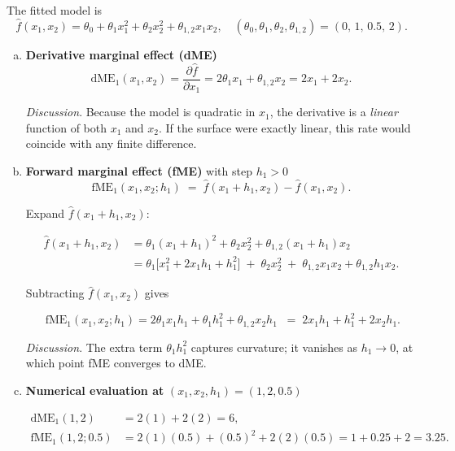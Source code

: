 \loesung
{

\vspace{0.5em}
The fitted model is
\[
  \hat{f}(x_1,x_2)=\theta_0+\theta_1 x_1^{2}+\theta_2 x_2^{2}+ \theta_{1,2}x_1x_2,
  \quad
  (\theta_0,\theta_1,\theta_2,\theta_{1,2})=(0,\,1,\,0.5,\,2).
\]

\begin{enumerate}[a)]
\item \textbf{Derivative marginal effect (dME)}\\[0.1em]
\[
  \text{dME}_1(x_1,x_2)=
  \frac{\partial\hat f}{\partial x_1}
  =2\theta_1x_1+\theta_{1,2}x_2
  =2x_1+2x_2.
\]

\emph{Discussion}.  
Because the model is quadratic in \(x_1\), the derivative is a \emph{linear}
function of both \(x_1\) and \(x_2\).  
If the surface were exactly linear, this rate would coincide with any finite
difference.

\item \textbf{Forward marginal effect (fME)} with step \(h_1>0\)\\[0.1em]

\[
  \text{fME}_1(x_1,x_2;h_1) \;=\;
  \hat f(x_1+h_1,x_2)-\hat f(x_1,x_2).
\]

Expand \(\hat f(x_1+h_1,x_2)\):

\begin{align*}
  \hat f(x_1\!+\!h_1,x_2)
  &=\theta_1(x_1+h_1)^2+\theta_2x_2^2+\theta_{1,2}(x_1+h_1)x_2 \\
  &=\theta_1\bigl[x_1^2+2x_1h_1+h_1^2\bigr]
    \;+\;\theta_2x_2^2
    \;+\;\theta_{1,2}x_1x_2+\theta_{1,2}h_1x_2.
\end{align*}

Subtracting \(\hat f(x_1,x_2)\) gives

\[
  \boxed{\;
  \text{fME}_1(x_1,x_2;h_1)=
  2\theta_1x_1h_1+\theta_1h_1^{2}+\theta_{1,2}x_2h_1
  \;}
  \;=\;
  2x_1h_1+h_1^{2}+2x_2h_1 .
\]

\emph{Discussion}.  
The extra term \(\theta_1h_1^{2}\) captures curvature; it vanishes as
\(h_1\to0\), at which point fME converges to dME.

\item \textbf{Numerical evaluation at} \((x_1,x_2,h_1)=(1,2,0.5)\)

\[
\begin{aligned}
  \text{dME}_1(1,2) &= 2(1)+2(2)=6,\\[0.2em]
  \text{fME}_1(1,2;0.5) &= 2(1)(0.5)+(0.5)^2+2(2)(0.5)=1+0.25+2=3.25.
\end{aligned}
\]


\end{enumerate}}
